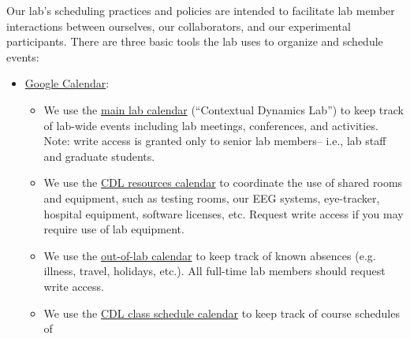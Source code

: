 \documentclass{tufte-book} %
\begin{document}
\label{sec: scheduling}

\noindent{}Our lab's scheduling practices and
policies are intended to facilitate lab member interactions between
ourselves, our collaborators, and our experimental participants.
There are three basic tools the lab uses to organize and schedule
events:
\begin{itemize}
\item \href{http://calendar.google.com}{Google Calendar}:
  \begin{itemize}
  \item We use the
    \href{https://calendar.google.com/calendar/ical/5ta50cfv4uih0a0k8m2di9dhjo\%40group.calendar.google.com/private-ff1338ddce84ac37d5ab682cd94e7f69/basic.ics}{main
      lab calendar} (``Contextual Dynamics Lab'') to keep track of lab-wide events including lab
    meetings, conferences, and activities.  Note: write access is
    granted only to senior lab members-- i.e., lab staff and graduate students.
  \item We use the
    \href{https://calendar.google.com/calendar/ical/dgcv8l8a8s10hfg2s5h0qec0q0\%40group.calendar.google.com/private-4810aed94f818d5748045447ab46c62d/basic.ics}{CDL
      resources calendar} to coordinate the use of shared rooms and
    equipment, such as testing rooms, our EEG systems, eye-tracker,
    hospital equipment, software licenses, etc.  Request write access
    if you may require use of lab equipment.
  \item We use the
    \href{https://calendar.google.com/calendar/ical/h1j06dohcg7v1g2o5tkb7ijhvs\%40group.calendar.google.com/private-239aaf8b4dc60480c90e8d7fc353e229/basic.ics}{out-of-lab
      calendar} to keep track of known absences (e.g. illness, travel,
    holidays, etc.).    All
    full-time lab members should request write access.
  \item We use the
    \href{https://calendar.google.com/calendar/ical/v2selomg4o6aobua7g922aamqc\%40group.calendar.google.com/private-4377dd542d0d1f6226c9657955b778c5/basic.ics}{CDL
      class schedule calendar} to keep track of course schedules of

\end{itemize}
\end{itemize}
\end{document}
